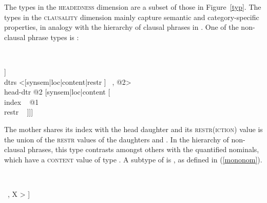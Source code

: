 \documentclass[output=paper
                ,modfonts
                ,nonflat
	        ,collection
	        ,collectionchapter
	        ,collectiontoclongg
 	        ,biblatex
                ,babelshorthands
                ,newtxmath
                ,draftmode
                ,colorlinks, citecolor=brown
]{./langsci/langscibook}
\begin{document}
The types in the \textsc{headedness} dimension are a subset of those in Figure~\ref{typ}.  
The types in the \textsc{clausality} dimension mainly capture semantic and 
category-specific properties, in analogy with the hierarchy of clausal phrases 
in \citet{GS00}. One of the non-clausal phrase types is : 

\begin{exe}
\ex\label{param} 
 ~ \impl ~
\begin{avm}
[synsem|loc [category|head ~ \type{noun}                              \\
             content [\type{parameter}                               \\
                      index ~ @1                                       \\
                      restr ~ \ibox{\Sigma_{1}} $\cup$ \ibox{\Sigma_{2}}]] \\
 dtrs <[synsem|loc|content|restr  ] ~, @2>     \\
 head-dtr @2 [synsem|loc|content [                  \\
                                    index ~ @1                         \\
                                    restr ~  ]]]
\end{avm}
\end{exe}

\noindent
The mother shares its index with the head daughter  and 
its \textsc{restr(iction)} value is the union of the \textsc{restr} values 
of the daughters  and . 
In the hierarchy of non-clausal phrases, this type contrasts amongst others with 
the quantified nominals, which have a \textsc{content} value of type 
 \citep[203--205]{GS00}. A subtype of  is  
, as defined in (\ref{mononom}).  

\begin{exe}
\ex\label{mononom} 
 ~ \impl ~ 
\begin{avm}
[synsem|loc|content|index ~ @1      \\
 dtrs <[synsem|loc|content|index ~ @1 ] ~, X > ]
\end{avm}
\end{exe}
\end{document}
